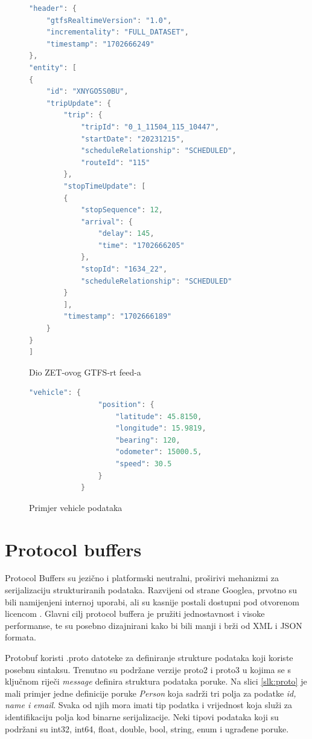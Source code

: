\documentclass[zavrsnirad]{fer}
\begin{document}
\begin{figure}[H]
	\centering
	

	\begin{minipage}[htb]{0.58\linewidth}
		\centering
		
		\begin{lstlisting}[language=Java]
"header": {
	"gtfsRealtimeVersion": "1.0",
	"incrementality": "FULL_DATASET",
	"timestamp": "1702666249"
},
"entity": [
{
	"id": "XNYGO5S0BU",
	"tripUpdate": {
		"trip": {
			"tripId": "0_1_11504_115_10447",
			"startDate": "20231215",
			"scheduleRelationship": "SCHEDULED",
			"routeId": "115"
		},
		"stopTimeUpdate": [
		{
			"stopSequence": 12,
			"arrival": {
				"delay": 145,
				"time": "1702666205"
			},
			"stopId": "1634_22",
			"scheduleRelationship": "SCHEDULED"
		}
		],
		"timestamp": "1702666189"
	}
}
]
		\end{lstlisting} 
		\caption{Dio ZET-ovog GTFS-rt feed-a}
		\label{slk:reply1}
	\end{minipage}
	\hfill
	\begin{minipage}[htb]{0.38\linewidth}
		\centering
		\begin{lstlisting}[language=Java]
			"vehicle": {
				"position": {
					"latitude": 45.8150,
					"longitude": 15.9819,
					"bearing": 120,
					"odometer": 15000.5,
					"speed": 30.5
				}
			}
		\end{lstlisting}
		\caption{Primjer vehicle podataka}
		\label{slk:reply2}
	\end{minipage}
\end{figure}


\newpage
\section[Protobuf]{Protocol buffers}
\label{sec:protobuf}

Protocol Buffers su jezično i platformski neutralni, proširivi mehanizmi za serijalizaciju strukturiranih podataka. Razvijeni od strane Googlea, prvotno su bili namijenjeni internoj uporabi, ali su kasnije postali dostupni pod otvorenom licencom \cite{protobuf}. Glavni cilj protocol buffera je pružiti jednostavnost i visoke performanse, te su posebno dizajnirani kako bi bili manji i brži od XML i JSON formata.


Protobuf koristi .proto datoteke za definiranje strukture podataka koji koriste posebnu sintaksu. Trenutno su podržane verzije proto2 i proto3 u kojima se s ključnom riječi \textit{message} definira struktura podataka poruke. Na slici \ref{slk:proto} je mali primjer jedne definicije poruke \textit{Person} koja sadrži tri polja za podatke \textit{id, name i email}. Svaka od njih mora imati tip podatka i vrijednost koja služi za identifikaciju polja kod binarne serijalizacije. Neki tipovi podataka koji su podržani su int32, int64, float, double, bool, string, enum i ugrađene poruke.
\end{document}

